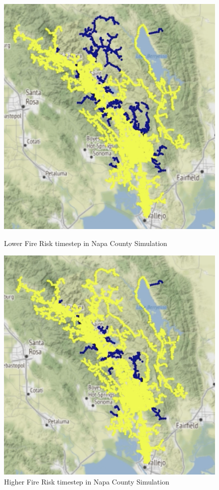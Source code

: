 \documentclass{article}
\begin{document}
\begin{figure}[H]
    \centering
    \begin{minipage}{0.4\textwidth}
        \centering
        \includegraphics[width=.9\textwidth]{resultsmap.png}
        \caption{Lower Fire Risk timestep in Napa County Simulation}
    \end{minipage}\hfill
    \begin{minipage}{0.4\textwidth}
        \centering
        \includegraphics[width=.9\textwidth]{resultsMap2.png}
        \caption{Higher Fire Risk timestep in Napa County Simulation}
    \end{minipage}
\end{figure}
\end{document}
